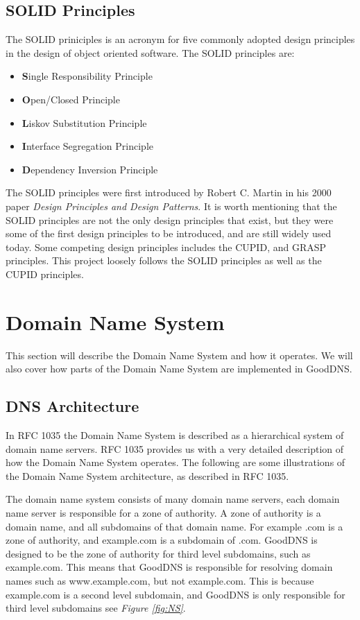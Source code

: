 \documentclass[12pt]{article}
\begin{document}
\subsection{SOLID Principles}
The SOLID\cite{SOLID2023} priniciples is an acronym for five commonly adopted design principles in the design of object oriented software.
The SOLID principles are:
\begin{itemize}
    \item \textbf{S}ingle Responsibility Principle
    \item \textbf{O}pen/Closed Principle
    \item \textbf{L}iskov Substitution Principle
    \item \textbf{I}nterface Segregation Principle
    \item \textbf{D}ependency Inversion Principle
\end{itemize}
The SOLID principles were first introduced by Robert C. Martin in his 2000 paper 
\textit{Design Principles and Design Patterns}\cite{martinDesignPrinciplesDesign2000}.
It is worth mentioning that the SOLID principles are not the only design principles that exist, but they were some 
of the first design principles to be introduced, and are still widely used today. Some competing design principles includes
the CUPID\cite{CUPIDJoyfulCoding2022}, and GRASP\cite{GRASPObjectorientedDesign2023} principles. This project loosely 
follows the SOLID principles as well as the CUPID\cite{CUPIDJoyfulCoding2022} principles.

\section{Domain Name System}
This section will describe the Domain Name System and how it operates.
We will also cover how parts of the Domain Name System are implemented in GoodDNS.

\subsection{DNS Architecture}
In RFC 1035\cite{DomainNamesImplementation1987} the Domain Name System is described as a hierarchical system of domain name servers.
RFC 1035\cite{DomainNamesImplementation1987} provides us with a very detailed description of how the Domain Name System operates.
The following are some illustrations of the Domain Name System architecture, as described in RFC 1035\cite{DomainNamesImplementation1987}.

The domain name system consists of many domain name servers, each domain name server is responsible for a zone of authority.
A zone of authority is a domain name, and all subdomains of that domain name. For example .com is a zone of authority, and example.com is a subdomain of .com.
GoodDNS is designed to be the zone of authority for third level subdomains, such as example.com. This means that GoodDNS is responsible for resolving
domain names such as www.example.com, but not example.com. This is because example.com is a second level subdomain, and GoodDNS is only responsible for 
third level subdomains see \textit{Figure \ref{fig:NS}}.
\end{document}
